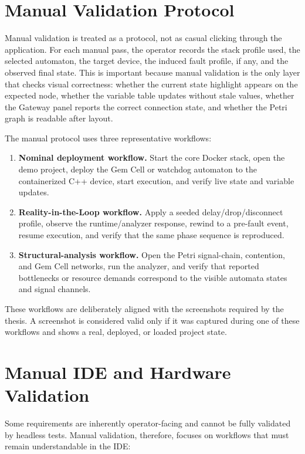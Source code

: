 \section{Manual Validation Protocol}

Manual validation is treated as a protocol, not as casual clicking through the application. For each manual pass, the operator records the stack profile used, the selected automaton, the target device, the induced fault profile, if any, and the observed final state. This is important because manual validation is the only layer that checks visual correctness: whether the current state highlight appears on the expected node, whether the variable table updates without stale values, whether the Gateway panel reports the correct connection state, and whether the Petri graph is readable after layout.

The manual protocol uses three representative workflows:

\begin{enumerate}
  \item \textbf{Nominal deployment workflow.} Start the core Docker stack, open the demo project, deploy the Gem Cell or watchdog automaton to the containerized C++ device, start execution, and verify live state and variable updates.
  \item \textbf{Reality-in-the-Loop workflow.} Apply a seeded delay/drop/disconnect profile, observe the runtime/analyzer response, rewind to a pre-fault event, resume execution, and verify that the same phase sequence is reproduced.
  \item \textbf{Structural-analysis workflow.} Open the Petri signal-chain, contention, and Gem Cell networks, run the analyzer, and verify that reported bottlenecks or resource demands correspond to the visible automata states and signal channels.
\end{enumerate}

These workflows are deliberately aligned with the screenshots required by the thesis. A screenshot is considered valid only if it was captured during one of these workflows and shows a real, deployed, or loaded project state.

\section{Manual IDE and Hardware Validation}

Some requirements are inherently operator-facing and cannot be fully validated by headless tests. Manual validation, therefore, focuses on workflows that must remain understandable in the IDE:

